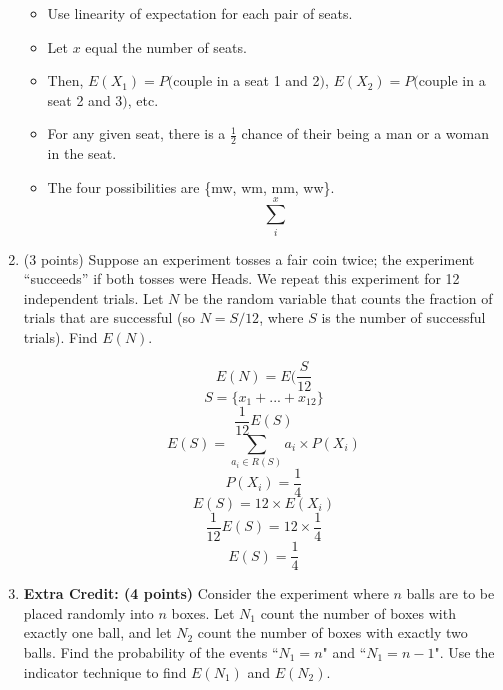 \documentclass[11pt]{article}
\begin{document}
\begin{enumerate}
\begin{itemize}

	\item Use linearity of expectation for each pair of seats.
	\item Let $x$ equal the number of seats.
	\item Then, $E(X_1) = P($couple in a seat 1 and 2$)$, $E(X_2) = P($couple in a seat 2 and 3$)$, etc.
	\item For any given seat, there is a $\frac{1}{2}$ chance of their being a man or a woman in the seat.
	\item The four possibilities are \{mw, wm, mm, ww\}.
		  \[\sum_{i}^{x} \]

\end{itemize}

\item (3 points) Suppose an experiment tosses a fair coin twice;  the experiment
``succeeds'' if both tosses were Heads.  We repeat this experiment 
for 12 independent trials.  Let $N$ be the random variable that counts
the fraction of trials that are successful (so $N = S/12$, where
$S$ is the number of successful trials).  Find $E(N)$.


	\[ E(N) = E(\frac{S}{12} \]
	\[ S = \{ x_1 + ... + x_12 \} \]
	\[\frac{1}{12} E(S) \]
	\[E(S) = \sum_{a_i \in R(S)} a_i \times P(X_i) \]
	\[P(X_i) = \frac{1}{4} \]
	\[E(S) = 12 \times E(X_i) \]
	\[\frac{1}{12}E(S) = 12 \times \frac{1}{4} \]
	\[ E(S) = \frac{1}{4} \]


\item \textbf{Extra Credit: (4 points)} Consider the experiment where $n$ balls
are to be placed randomly into $n$ boxes. Let $N_1$ count the number of boxes
with exactly one ball, and let $N_2$ count the number of boxes with exactly two
balls. Find the probability of the events ``$N_1 = n$" and ``$N_1 = n - 1$".
Use the indicator technique to find $E(N_1)$ and $E(N_2)$.


\end{enumerate}
\end{document}
